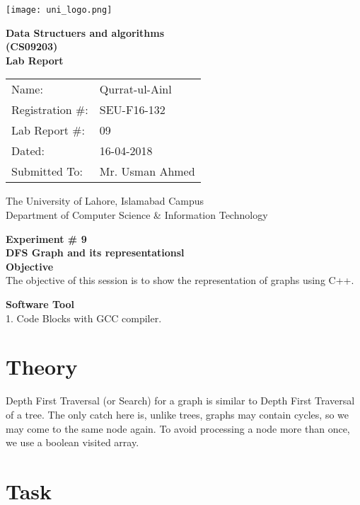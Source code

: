 \documentclass[11pt]{article}            %
\begin{document}
\begin{titlepage}
    \centering
  \vfill
    \texttt{[image: uni\_logo.png]} \\ 
	\vskip2cm
    {\bfseries\Large
	Data Structuers and algorithms \\ (CS09203)\\
	
	\vskip2cm
	Lab Report 
	 
	\vskip2cm
	}    

\begin{center}
\begin{tabular}{ l l  } 

Name: & Qurrat-ul-Ainl \\ 
Registration \#: & SEU-F16-132 \\ 
Lab Report \#: & 09 \\ 
 Dated:& 16-04-2018\\ 
Submitted To:& Mr. Usman Ahmed\\ 

\end{tabular}
\end{center}
    \vfill
    The University of Lahore, Islamabad Campus\\
Department of Computer Science \& Information Technology
\end{titlepage}


    
    {\bfseries\Large
\centering
	Experiment \# 9 \\

DFS Graph and its representationsl \\
	
	}    
 \vskip1cm
 \textbf {Objective}\\ The objective of this session is to show the representation of graphs using C++. 
 
 \textbf {Software Tool} \\
 1. Code Blocks with GCC compiler.

\section{Theory }              

Depth First Traversal (or Search) for a graph is similar to Depth First Traversal of a tree. The only catch here is, unlike trees, graphs may contain cycles, so we may come to the same node again. To avoid processing a node more than once, we use a boolean visited array.
\section{Task}  
\end{document}

